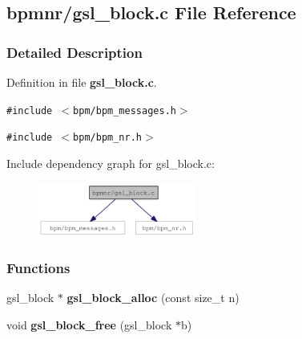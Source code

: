 \subsection{bpmnr/gsl\_\-block.c File Reference}
\label{gsl__block_8c}


\subsubsection{Detailed Description}


Definition in file {\bf gsl\_\-block.c}.

{\tt \#include $<$bpm/bpm\_\-messages.h$>$}\par
{\tt \#include $<$bpm/bpm\_\-nr.h$>$}\par


Include dependency graph for gsl\_\-block.c:\nopagebreak
\begin{figure}[H]
\begin{center}
\leavevmode
\includegraphics[width=147pt]{gsl__block_8c__incl}
\end{center}
\end{figure}
\subsubsection*{Functions}
\begin{CompactItemize}
\item 
gsl\_\-block $\ast$ {\bf gsl\_\-block\_\-alloc} (const size\_\-t n)
\item 
void \textbf{gsl\_\-block\_\-free} (gsl\_\-block $\ast$b)\label{group__nr_g0952127372c14dce3c3aa65ec0ad9c1e}

\end{CompactItemize}
